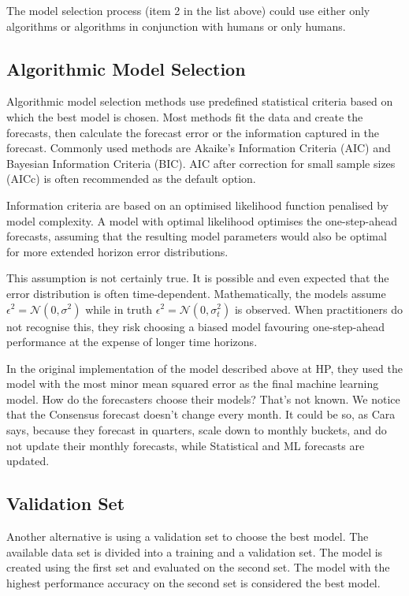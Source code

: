 \documentclass[12pt]{article}
\begin{document}
The model selection process (item 2 in the list above) could use either only algorithms or algorithms in conjunction with humans or only humans.

\subsection{Algorithmic Model Selection} 

Algorithmic model selection methods use predefined statistical criteria based on which the best model is chosen. Most methods fit the data and create the forecasts, then calculate the forecast error or the information captured in the forecast. Commonly used methods are Akaike's Information Criteria (AIC) and Bayesian Information Criteria (BIC). AIC after correction for small sample sizes (AICc) is often recommended as the default option.

Information criteria are based on an optimised likelihood function penalised by model complexity. A model with optimal likelihood optimises the one-step-ahead forecasts, assuming that the resulting model parameters would also be optimal for more extended horizon error distributions. 

This assumption is not certainly true. It is possible and even expected that the error distribution is often time-dependent. Mathematically, the models assume $\epsilon^2 = \mathcal{N}(0, \sigma^2)$ while in truth $\epsilon^2 = \mathcal{N}(0, \sigma_t^2)$ is observed. When practitioners do not recognise this, they risk choosing a biased model favouring one-step-ahead performance at the expense of longer time horizons.

In the original implementation of the model described above at HP, they used the model with the most minor mean squared error as the final machine learning model. How do the forecasters choose their models? That's not known. We notice that the Consensus forecast doesn't change every month. It could be so, as Cara says, because they forecast in quarters, scale down to monthly buckets, and do not update their monthly forecasts, while Statistical and ML forecasts are updated.

\subsection{Validation Set}

Another alternative is using a validation set to choose the best model. The available data set is divided into a training and a validation set. The model is created using the first set and evaluated on the second set. The model with the highest performance accuracy on the second set is considered the best model.
\end{document}
